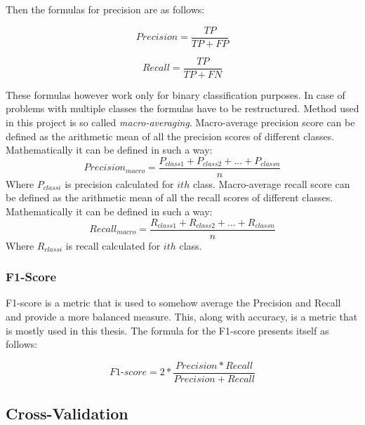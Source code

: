 \documentclass[a4paper,twoside,12pt]{book}
\begin{document}
Then the formulas for precision are as follows:

\begin{equation}
Precision = \frac{TP}{TP + FP}
\end{equation}

\begin{equation}
Recall = \frac{TP}{TP + FN}
\end{equation}

These formulas however work only for binary classification purposes. In case of problems with multiple classes the formulas have to be restructured. Method used in this project is so called \emph{macro-averaging}.
\newline
Macro-average precision score can be defined as the arithmetic mean of all the precision scores of different classes. Mathematically it can be defined in such a way:
\begin{equation}
Precision_{macro} = \frac{P_{class1} + P_{class2} + ... + P_{classn}}{n}
\end{equation}
Where $P_{classi}$ is precision calculated for $ith$ class.
\newline
Macro-average recall score can be defined as the arithmetic mean of all the recall scores of different classes. Mathematically it can be defined in such a way:
\begin{equation}
Recall_{macro} = \frac{R_{class1} + R_{class2} + ... + R_{classn}}{n}
\end{equation}
Where $R_{classi}$ is recall calculated for $ith$ class.
\subsubsection{F1-Score}

F1-score is a metric that is used to somehow average the Precision and Recall and provide a more balanced measure. This, along with accuracy, is a metric that is mostly used in this thesis. The formula for the F1-score presents itself as follows:

\begin{equation}
F1\mbox{-}score = 2 * \frac{Precision * Recall}{Precision + Recall}
\end{equation}

\subsection{Cross-Validation}
\end{document}
